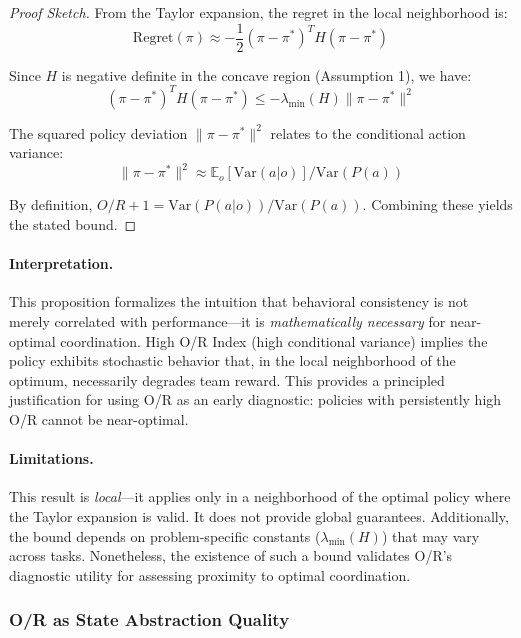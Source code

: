\begin{proof}[Proof Sketch]
From the Taylor expansion, the regret in the local neighborhood is:
\begin{equation}
\text{Regret}(\pi) \approx -\frac{1}{2} (\pi - \pi^*)^T H (\pi - \pi^*)
\end{equation}

Since $H$ is negative definite in the concave region (Assumption 1), we have:
\begin{equation}
(\pi - \pi^*)^T H (\pi - \pi^*) \leq -\lambda_{\min}(H) \|\pi - \pi^*\|^2
\end{equation}

The squared policy deviation $\|\pi - \pi^*\|^2$ relates to the conditional action variance:
\begin{equation}
\|\pi - \pi^*\|^2 \approx \mathbb{E}_{o}[\text{Var}(a|o)] / \text{Var}(P(a))
\end{equation}

By definition, $O/R + 1 = \text{Var}(P(a|o)) / \text{Var}(P(a))$. Combining these yields the stated bound.
\end{proof}

\paragraph{Interpretation.}
This proposition formalizes the intuition that behavioral consistency is not merely correlated with performance—it is \textit{mathematically necessary} for near-optimal coordination. High O/R Index (high conditional variance) implies the policy exhibits stochastic behavior that, in the local neighborhood of the optimum, necessarily degrades team reward. This provides a principled justification for using O/R as an early diagnostic: policies with persistently high O/R cannot be near-optimal.

\paragraph{Limitations.}
This result is \textit{local}—it applies only in a neighborhood of the optimal policy where the Taylor expansion is valid. It does not provide global guarantees. Additionally, the bound depends on problem-specific constants ($\lambda_{\min}(H)$) that may vary across tasks. Nonetheless, the existence of such a bound validates O/R's diagnostic utility for assessing proximity to optimal coordination.

\subsubsection{O/R as State Abstraction Quality}

